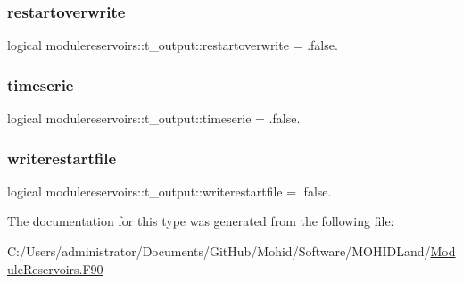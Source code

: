 \subsubsection{\texorpdfstring{restartoverwrite}{restartoverwrite}}
{\footnotesize\ttfamily logical modulereservoirs\+::t\+\_\+output\+::restartoverwrite = .false.\hspace{0.3cm}{\ttfamily [private]}}

\mbox{\label{structmodulereservoirs_1_1t__output_acbc7c2d2ac605a566882ad64764737f1}} 
\subsubsection{\texorpdfstring{timeserie}{timeserie}}
{\footnotesize\ttfamily logical modulereservoirs\+::t\+\_\+output\+::timeserie = .false.\hspace{0.3cm}{\ttfamily [private]}}

\mbox{\label{structmodulereservoirs_1_1t__output_a21c11480dfaabf538e6df98759ddceea}} 
\subsubsection{\texorpdfstring{writerestartfile}{writerestartfile}}
{\footnotesize\ttfamily logical modulereservoirs\+::t\+\_\+output\+::writerestartfile = .false.\hspace{0.3cm}{\ttfamily [private]}}



The documentation for this type was generated from the following file\+:\begin{DoxyCompactItemize}
\item 
C\+:/\+Users/administrator/\+Documents/\+Git\+Hub/\+Mohid/\+Software/\+M\+O\+H\+I\+D\+Land/\mbox{\hyperlink{_module_reservoirs_8_f90}{Module\+Reservoirs.\+F90}}\end{DoxyCompactItemize}
